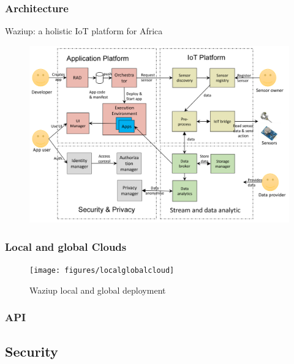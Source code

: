 \documentclass{beamer}
\begin{document}
\begin{frame}
\frametitle{Architecture}

Waziup: a holistic IoT platform for Africa
  \begin{figure} 
  \centering  
  \includegraphics[width=.9\linewidth]{figures/GlobalArch}   
  \label{figure-globalarch}  
  \end{figure} 
  
\end{frame}

\begin{frame}
\frametitle{Local and global Clouds}

  \begin{figure}[H] 
  \centering  
  \texttt{[image: figures/localglobalcloud]}   
  \caption{Waziup local and global deployment}
  \label{fig-localglobalcloud}  
  \end{figure}
    
\end{frame}

\begin{frame}
\frametitle{API}

    
\end{frame}
\subsection{Security}
\end{document}
